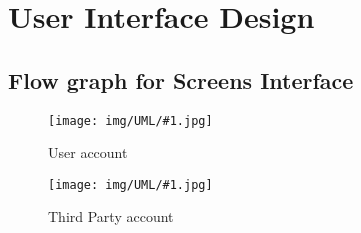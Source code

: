 \documentclass[../DD0.tex]{subfiles}
\begin{document}
\newcommand{\fetchUML}[4] {

  \begin{figure}[h!]

    \centering
    \hspace*{-#4cm}
    \texttt{[image: img/UML/\#1.jpg]}
    \caption{#2}
    \label{fig:#1}

  \end{figure}

}

\section {User Interface Design}
\subsection{Flow graph for Screens Interface}

\label{sec:userdes}

    \fetchUML
      {User}
      {User account}
      {1}           %
      {0}           %

  \clearpage

\label{sec:thirdpartydes}

    \fetchUML
      {Third_Party}
      {Third Party account}
      {1}           %
      {0}           %


\end{document}
